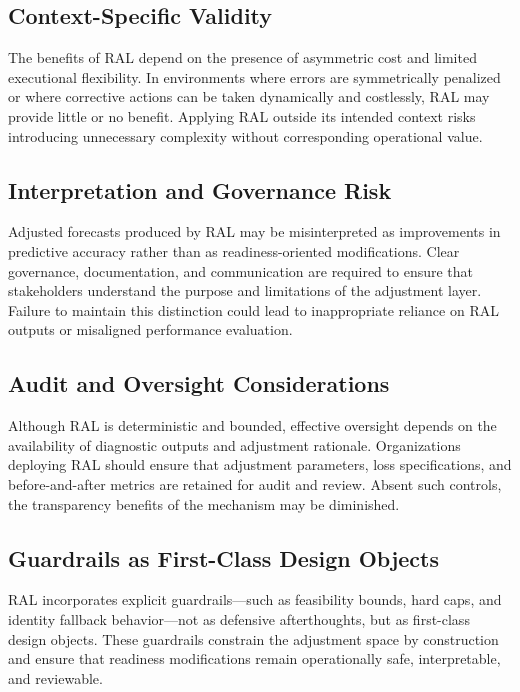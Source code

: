 \subsection{Context-Specific Validity}

The benefits of RAL depend on the presence of asymmetric cost and limited
executional flexibility. In environments where errors are symmetrically penalized
or where corrective actions can be taken dynamically and costlessly, RAL may
provide little or no benefit. Applying RAL outside its intended context risks
introducing unnecessary complexity without corresponding operational value.

\subsection{Interpretation and Governance Risk}

Adjusted forecasts produced by RAL may be misinterpreted as improvements in
predictive accuracy rather than as readiness-oriented modifications. Clear
governance, documentation, and communication are required to ensure that
stakeholders understand the purpose and limitations of the adjustment layer.
Failure to maintain this distinction could lead to inappropriate reliance on RAL
outputs or misaligned performance evaluation.

\subsection{Audit and Oversight Considerations}

Although RAL is deterministic and bounded, effective oversight depends on the
availability of diagnostic outputs and adjustment rationale. Organizations
deploying RAL should ensure that adjustment parameters, loss specifications, and
before-and-after metrics are retained for audit and review. Absent such controls,
the transparency benefits of the mechanism may be diminished.

\subsection{Guardrails as First-Class Design Objects}

RAL incorporates explicit guardrails—such as feasibility bounds, hard caps, and
identity fallback behavior—not as defensive afterthoughts, but as first-class
design objects. These guardrails constrain the adjustment space by construction
and ensure that readiness modifications remain operationally safe, interpretable,
and reviewable.

